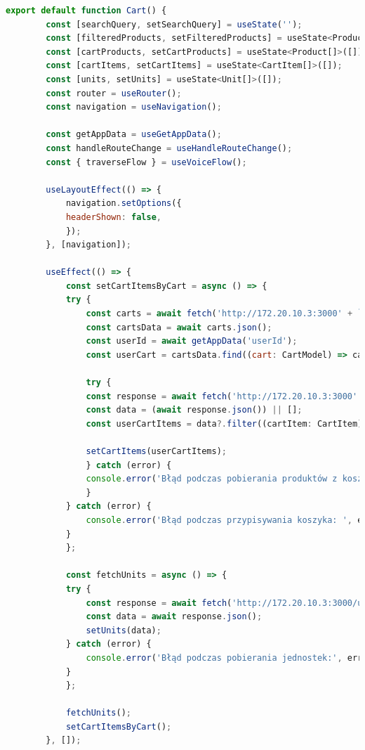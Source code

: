 \begin{lstlisting}[language=JavaScript, caption=Koszyk użytkownika implementacja, label=lst:view]
    export default function Cart() {
        const [searchQuery, setSearchQuery] = useState('');
        const [filteredProducts, setFilteredProducts] = useState<Product[]>([]);
        const [cartProducts, setCartProducts] = useState<Product[]>([]);
        const [cartItems, setCartItems] = useState<CartItem[]>([]);
        const [units, setUnits] = useState<Unit[]>([]);
        const router = useRouter();
        const navigation = useNavigation();

        const getAppData = useGetAppData();
        const handleRouteChange = useHandleRouteChange();
        const { traverseFlow } = useVoiceFlow();

        useLayoutEffect(() => {
            navigation.setOptions({
            headerShown: false,
            });
        }, [navigation]);

        useEffect(() => {
            const setCartItemsByCart = async () => {
            try {
                const carts = await fetch('http://172.20.10.3:3000' + `/carts`);
                const cartsData = await carts.json();
                const userId = await getAppData('userId');
                const userCart = cartsData.find((cart: CartModel) => cart.user_id === userId);

                try {
                const response = await fetch('http://172.20.10.3:3000' + `/cart-items`);
                const data = (await response.json()) || [];
                const userCartItems = data?.filter((cartItem: CartItem) => cartItem?.cart_id === userCart?.cart_id);

                setCartItems(userCartItems);
                } catch (error) {
                console.error('Błąd podczas pobierania produktów z koszyka:', error);
                }
            } catch (error) {
                console.error('Błąd podczas przypisywania koszyka: ', error);
            }
            };

            const fetchUnits = async () => {
            try {
                const response = await fetch('http://172.20.10.3:3000/units');
                const data = await response.json();
                setUnits(data);
            } catch (error) {
                console.error('Błąd podczas pobierania jednostek:', error);
            }
            };

            fetchUnits();
            setCartItemsByCart();
        }, []);


\end{lstlisting}
